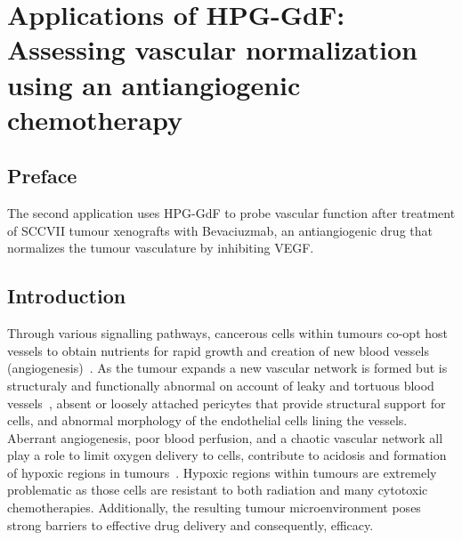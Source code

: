 
\chapter{Applications of \acs{HPG-GdF}: Assessing vascular normalization using an antiangiogenic chemotherapy}
\label{ch:HPG3}

\section{Preface}
The second application uses \acs{HPG-GdF} to probe vascular function after treatment of SCCVII tumour xenografts with Bevaciuzmab, an antiangiogenic drug that normalizes the tumour vasculature by inhibiting \acs{VEGF}.

\section{Introduction}

Through various signalling pathways, cancerous cells within tumours co-opt host vessels to obtain nutrients for rapid growth and creation of new blood vessels (angiogenesis)~\cite{Jain:2005gk}.
As the tumour expands a new vascular network is formed but is structuraly and functionally abnormal on account of leaky and tortuous blood vessels~\cite{McDonald:2002ut}, absent or loosely attached pericytes that provide structural support for cells, and abnormal morphology of the endothelial cells lining the vessels. 
Aberrant angiogenesis, poor blood perfusion, and a chaotic vascular network all play a role to limit oxygen delivery to cells, contribute to acidosis and formation of hypoxic regions in tumours~\cite{Jain:2005gk}.
Hypoxic regions within tumours are extremely problematic as those cells are resistant to both radiation and many cytotoxic chemotherapies.
Additionally, the resulting tumour microenvironment poses strong barriers to effective drug delivery and consequently, efficacy. 

